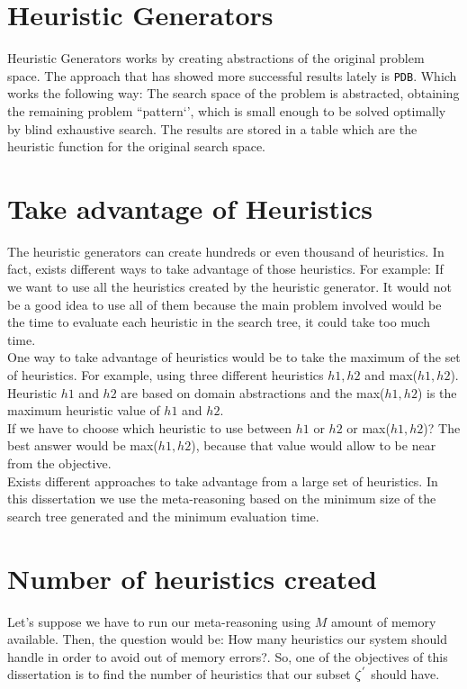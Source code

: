 \section{Heuristic Generators}
Heuristic Generators works by creating abstractions of the original problem space. The approach that has showed more successful results lately is \texttt{PDB}. Which works the following way: The search space of the problem is abstracted, obtaining the remaining problem ``pattern‘’, which is small enough to be solved optimally by blind exhaustive search. The results are stored in a table which are the heuristic function for the original search space.\\

\section{Take advantage of Heuristics}
The heuristic generators can create hundreds or even thousand of heuristics. In fact, exists different ways to take advantage of those heuristics. For example: If we want to use all the heuristics created by the heuristic generator. It would not be a good idea to use all of them because the main problem involved would be the time to evaluate each heuristic in the search tree, it could take too much time. \\

One way to take advantage of heuristics would be to take the maximum of the set of heuristics. For example, using three different heuristics $h1, h2$ and max($h1, h2$). Heuristic $h1$ and $h2$ are based on domain abstractions and the max($h1, h2$) is the maximum heuristic value of $h1$ and $h2$. \\

If we have to choose which heuristic to use between $h1$ or $h2$ or max($h1, h2$)? The best answer would be max($h1, h2$), because that value would allow to be near from the objective.\\

Exists different approaches to take advantage from a large set of heuristics. In this dissertation we use the meta-reasoning based on the minimum size of the search tree generated and the minimum evaluation time. \\

\section{Number of heuristics created}
Let's suppose we have to run our meta-reasoning using $M$ amount of memory available. Then, the question would be: How many heuristics our system should handle in order to avoid out of memory errors?. So, one of the objectives of this dissertation is to find the number of heuristics that our subset $\zeta\sp{'}$ should have.\\
 
